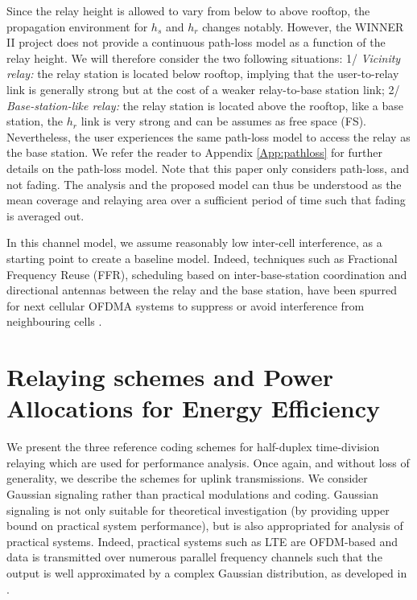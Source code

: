 \documentclass[journal]{IEEEtran}
\theoremstyle{definition}
\begin{document}
Since the relay height is allowed to vary from below to above rooftop, the propagation environment for $h_s$ and $h_r$ changes notably. However, the WINNER II project does not provide a continuous path-loss model as a function of the relay height. We will therefore consider the two following situations: 
1/ \textit{Vicinity relay:} the relay station is located below rooftop, implying that the user-to-relay link is generally strong but at the cost of a weaker relay-to-base station link; 
2/ \textit{Base-station-like relay:} the relay station is located above the rooftop, like a base station, the $h_r$ link is very strong and can be assumes as free space (FS). Nevertheless, the user experiences the same path-loss model to access the relay as the base station.
We refer the reader to Appendix \ref{App:pathloss} for further details on the path-loss model. Note that this paper only considers path-loss, and not fading. The analysis and the proposed model can thus be understood as the mean coverage and relaying area over a sufficient period of time such that fading is averaged out.


In this channel model, we assume reasonably low inter-cell interference, as a starting point to create a baseline model. Indeed, techniques such as Fractional Frequency Reuse (FFR), scheduling based on inter-base-station coordination and directional antennas between the relay and the base station, have been spurred for next cellular OFDMA systems to suppress or avoid interference from neighbouring cells \cite{book_LTE_Fund}.






\section{Relaying schemes and Power Allocations for Energy Efficiency}
\label{sec:schemes}

We present the three reference coding schemes for half-duplex time-division relaying which are used for performance analysis. Once again, and without loss of generality, we describe the schemes for uplink transmissions.
We consider Gaussian signaling rather than practical modulations and coding.
Gaussian signaling is not only suitable for theoretical investigation (by providing upper bound on practical system performance), but is also appropriated for analysis of practical systems. Indeed, practical systems such as LTE are OFDM-based and data is transmitted over numerous parallel frequency channels such that the output is well approximated by a complex Gaussian distribution, as developed in \cite{book_LTE_Fund, OFDM_Gaussian}.
\end{document}
